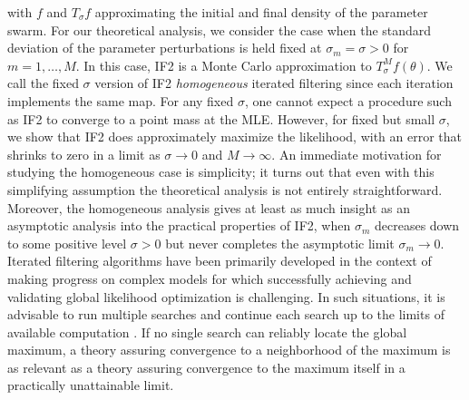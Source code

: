 \documentclass{pnastwo}\usepackage[]{graphicx}\usepackage[]{color}
\newcommand\fzero{f}
\newcommand\IF{IF2}
\begin{document}
\begin{article}
\begin{equation}
\end{equation}
with $f$ and $T_\sigma f$ approximating the initial and final density of the parameter swarm.
For our theoretical analysis, we consider the case when the standard deviation of the parameter perturbations is held fixed at $\sigma_m=\sigma>0$ for $m=1,\dots,M$. 
In this case,   {\IF} is a Monte Carlo approximation to $T_\sigma^M\fzero(\theta)$.
We call the fixed $\sigma$ version of  {\IF} {\it homogeneous} iterated filtering since each iteration implements the same map.
For any fixed $\sigma$, one cannot expect a procedure such as   {\IF} to converge to a point mass at the MLE.
However, for fixed but small $\sigma$, we show that  {\IF} does approximately maximize the likelihood, with an error that shrinks to zero in a limit as $\sigma\to 0$ and $M\to\infty$.
An immediate motivation for studying the homogeneous case is simplicity; it turns out that even with this simplifying assumption the theoretical analysis is not entirely straightforward.
Moreover, the homogeneous analysis gives at least as much insight as an asymptotic analysis into the practical properties of {\IF}, when $\sigma_m$ decreases down to some positive level $\sigma>0$ but never completes the asymptotic limit $\sigma_m\to 0$.
Iterated filtering algorithms have been primarily developed in the context of making progress on complex models for which successfully achieving and validating global likelihood optimization is challenging.
In such situations, it is advisable to run multiple searches and continue each search up to the limits of available computation \cite{ingber93}. 
If no single search can reliably locate the global maximum, a theory assuring convergence to a neighborhood of the maximum is as relevant as a theory assuring convergence to the maximum itself in a practically unattainable limit.


\end{article}
\end{document}
